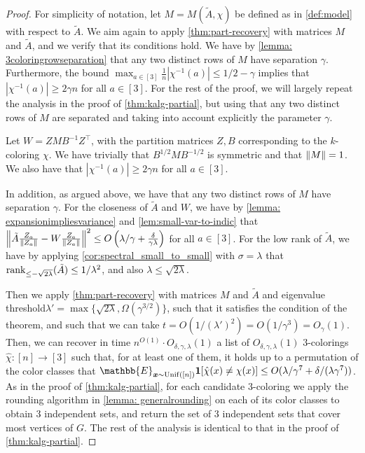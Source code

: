 \begin{proof}
For simplicity of notation, let $M = M(\tilde{A}, \chi)$ be defined as in \cref{def:model} with respect to $\tilde{A}$.
We aim again to apply \cref{thm:part-recovery} with matrices $M$ and $\tilde{A}$, and we verify that its conditions hold.
We have by \cref{lemma: 3coloringrowseparation} that any two distinct rows of $M$ have separation $\gamma$.
Furthermore, the bound $\max_{a \in [3]} \frac{1}{n} |\chi^{-1}(a)| \leq 1/2 - \gamma$ implies that $|\chi^{-1}(a)| \geq 2\gamma n$ for all $a \in [3]$.
For the rest of the proof, we will largely repeat the analysis in the proof of \cref{thm:kalg-partial}, but using that any two distinct rows of $M$ are separated and taking into account explicitly the parameter $\gamma$.

Let $W = Z M B^{-1} Z^\top$, with the partition matrices $Z, B$ corresponding to the $k$-coloring $\chi$.
We have trivially that $B^{1/2} M B^{-1/2}$ is symmetric and that $\left\lVert M\right\rVert = 1$.
We also have that $|\chi^{-1}(a)| \geq 2\gamma n$ for all $a \in [3]$.

In addition, as argued above, we have that any two distinct rows of $M$ have separation $\gamma$.
For the closeness of $\tilde{A}$ and $W$, we have by \cref{lemma: expansionimpliesvariance} and \cref{lem:small-var-to-indic} that $\left\lVert\tilde{A} \frac{Z_a}{\left\lVert Z_a\right\rVert} - W \frac{Z_a}{\left\lVert Z_a\right\rVert}\right\rVert^2 \leq O\left(\lambda/\gamma + \frac{\delta}{\gamma \lambda}\right)$ for all $a \in [3]$.
For the low rank of $\tilde{A}$, we have by applying \cref{cor:spectral_small_to_small} with $\sigma=\lambda$ that $\operatorname{rank}_{\leq -\sqrt{2\lambda}}(\tilde{A}) \leq 1/\lambda^2$, and also $\lambda \leq \sqrt{2 \lambda}$. 

Then we apply \cref{thm:part-recovery} with matrices $M$ and $\tilde{A}$ and eigenvalue threshold\linebreak $\lambda' = \max\{\sqrt{2 \lambda}, \Omega(\gamma^{3/2})\}$, such that it satisfies the condition of the theorem, and such that we can take $t = O(1/(\lambda')^2) = O(1/\gamma^3) = O_{\gamma}(1)$.
Then, we can recover in time $n^{O(1)} \cdot O_{\delta,\gamma,\lambda}(1)$ a list of $O_{\delta,\gamma,\lambda}(1)$ $3$-colorings $\hat{\chi}: [n] \to [3]$ such that, for at least one of them, it holds up to a permutation of the color classes that $\mathbb{E}_{\bm{x} \sim \operatorname{Unif}([n])} \1[\hat\chi(x) \neq \chi(x)] \leq O(\lambda/\gamma^7+\delta/(\lambda\gamma^7))$.
As in the proof of \cref{thm:kalg-partial}, for each candidate $3$-coloring we apply the rounding algorithm in \cref{lemma: generalrounding} on each of its color classes to obtain $3$ independent sets, and return the set of $3$ independent sets that cover most vertices of $G$.
The rest of the analysis is identical to that in the proof of \cref{thm:kalg-partial}.
\end{proof}

